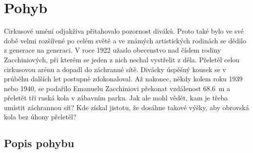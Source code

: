 \setchaptertoc
\chapter{Pohyb}\label{fyz:IchapVIII}
  Cirkusové umění odjakživa přitahovalo pozornost diváků. Proto také bylo ve své době velmi
  rozšířené po celém světě a ve známých artistických rodinách se dědilo z generace na generaci. V
  roce 1922 užaslo obecenstvo nad číslem rodiny Zacchiniových, při kterém se jeden z nich nechal
  vystřelit z děla. Přeletěl celou cirkusovou arénu a dopadl do záchranné sítě. Divácky úspěšný
  kousek se v průběhu dalších let postupně zdokonaloval. Až nakonec, někdy kolem roku 1939 nebo
  1940, se podařilo Emanuelu Zacchiniovi překonat vzdálenost \qty{68.6}{\metre} a přeletět tři ruská
  kola v zábavním parku. Jak ale mohl vědět, kam je třeba umístit záchrannou síť? Kde získal
  jistotu, že dosáhne takové výšky, aby obrovská kola bez úhony přeletěl?

  \section{Popis pohybu}\label{fyz:IchapVIIIsecI}
      
